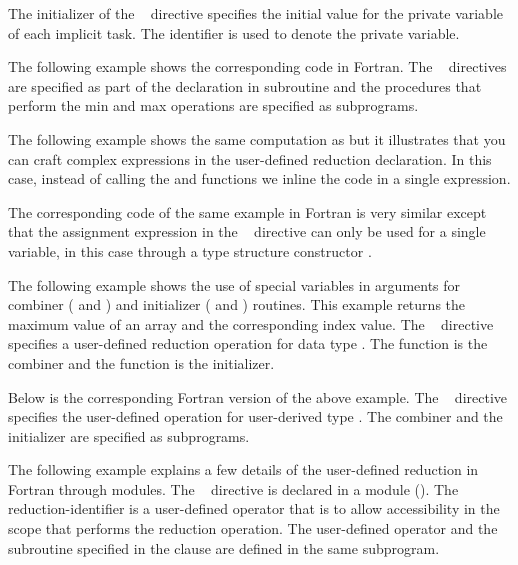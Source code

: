 The initializer of the ~ directive specifies
the initial value for the private variable of each implicit task.
The  identifier is used to denote the private variable.

\clearpage

The following example shows the corresponding code in Fortran. 
The ~ directives are specified as part of 
the declaration in subroutine  and 
the procedures that perform the min and max operations are specified as subprograms.



The following example shows the same computation as  but it illustrates that you can craft complex expressions in the user-defined reduction declaration. In this case, instead of calling the  and  functions we inline the code in a single expression.


The corresponding code of the same example in Fortran is very similar
except that the assignment expression in the ~
directive can only be used for a single variable, in this case through
a type structure constructor .



The following example shows the use of special variables in arguments for combiner ( and ) and initializer ( and ) routines.  This example returns the maximum value of an array and the corresponding index value. The ~ directive specifies a user-defined reduction operation  for data type  . The function  is the combiner and the function  is the initializer.


Below is the corresponding Fortran version of the above example.  The ~ directive specifies the user-defined operation  for user-derived type .  The combiner  and the initializer  are specified as subprograms.



The following example explains a few details of the user-defined reduction 
in Fortran through modules. The ~ directive is declared in a module (). 
The reduction-identifier  is a user-defined operator that is
to allow accessibility in the scope that performs the reduction
operation.
The user-defined operator  and the subroutine  specified in the  clause are defined in the same subprogram.


